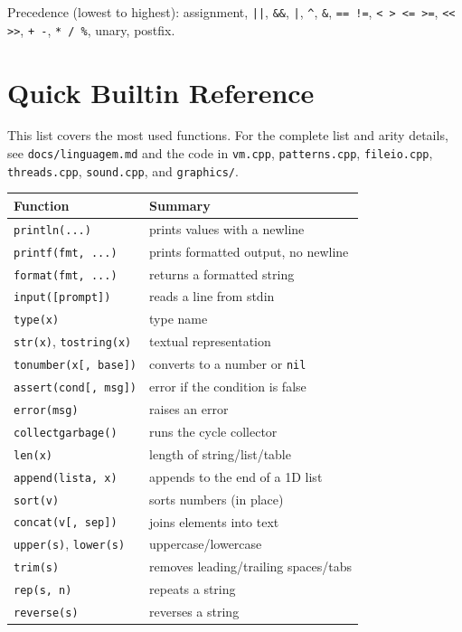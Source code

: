 \documentclass[11pt,a4paper,oneside]{report}
\newcommand{\code}[1]{\texttt{#1}}
\newcommand{\file}[1]{\texttt{#1}}
\begin{document}
Precedence (lowest to highest): assignment, \code{||},
\code{\&\&}, \code{|}, \code{\^{}}, \code{\&}, \code{== !=},
\code{< > <= >=}, \code{<< >>}, \code{+ -}, \code{* / \%}, unary,
postfix.

\chapter{Quick Builtin Reference}
\label{ap:builtins}

This list covers the most used functions. For the complete list and
arity details, see \file{docs/linguagem.md} and the code in
\file{vm.cpp}, \file{patterns.cpp}, \file{fileio.cpp},
\file{threads.cpp}, \file{sound.cpp}, and \file{graphics/}.

\begin{longtable}{@{}L{4.8cm}L{10.5cm}@{}}
\toprule
Function & Summary \\
\midrule
\endhead
\code{println(...)} & prints values with a newline \\
\code{printf(fmt, ...)} & prints formatted output, no newline \\
\code{format(fmt, ...)} & returns a formatted string \\
\code{input([prompt])} & reads a line from stdin \\
\code{type(x)} & type name \\
\code{str(x)}, \code{tostring(x)} & textual representation \\
\code{tonumber(x[, base])} & converts to a number or \code{nil} \\
\code{assert(cond[, msg])} & error if the condition is false \\
\code{error(msg)} & raises an error \\
\code{collectgarbage()} & runs the cycle collector \\
\midrule
\code{len(x)} & length of string/list/table \\
\code{append(lista, x)} & appends to the end of a 1D list \\
\code{sort(v)} & sorts numbers (in place) \\
\code{concat(v[, sep])} & joins elements into text \\
\code{upper(s)}, \code{lower(s)} & uppercase/lowercase \\
\code{trim(s)} & removes leading/trailing spaces/tabs \\
\code{rep(s, n)} & repeats a string \\
\code{reverse(s)} & reverses a string \\

\end{longtable}
\end{document}
